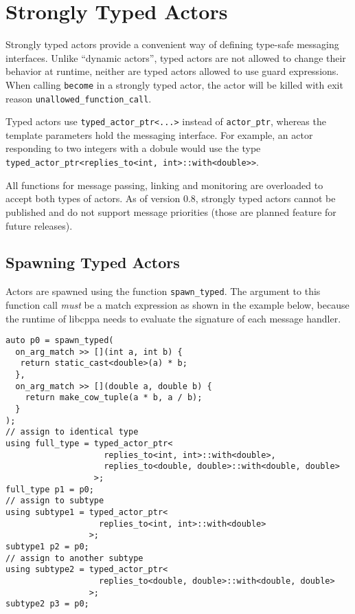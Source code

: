 \section{Strongly Typed Actors}

Strongly typed actors provide a convenient way of defining type-safe messaging interfaces.
Unlike ``dynamic actors'', typed actors are not allowed to change their behavior at runtime, neither are typed actors allowed to use guard expressions.
When calling \lstinline^become^ in a strongly typed actor, the actor will be killed with exit reason \lstinline^unallowed_function_call^.

Typed actors use \lstinline^typed_actor_ptr<...>^ instead of \lstinline^actor_ptr^, whereas the template parameters hold the messaging interface.
For example, an actor responding to two integers with a dobule would use the type \lstinline^typed_actor_ptr<replies_to<int, int>::with<double>>^.

All functions for message passing, linking and monitoring are overloaded to accept both types of actors.
As of version 0.8, strongly typed actors cannot be published and do not support message priorities (those are planned feature for future releases).

\subsection{Spawning Typed Actors}
\label{sec:strong:spawn}

Actors are spawned using the function \lstinline^spawn_typed^.
The argument to this function call \emph{must} be a match expression as shown in the example below, because the runtime of libcppa needs to evaluate the signature of each message handler.

\begin{lstlisting}
auto p0 = spawn_typed(
  on_arg_match >> [](int a, int b) {
   return static_cast<double>(a) * b;
  },
  on_arg_match >> [](double a, double b) {
    return make_cow_tuple(a * b, a / b);
  }
);
// assign to identical type
using full_type = typed_actor_ptr<
                    replies_to<int, int>::with<double>,
                    replies_to<double, double>::with<double, double>
                  >;
full_type p1 = p0;
// assign to subtype
using subtype1 = typed_actor_ptr<
                   replies_to<int, int>::with<double>
                 >;
subtype1 p2 = p0;
// assign to another subtype
using subtype2 = typed_actor_ptr<
                   replies_to<double, double>::with<double, double>
                 >;
subtype2 p3 = p0;
\end{lstlisting}

